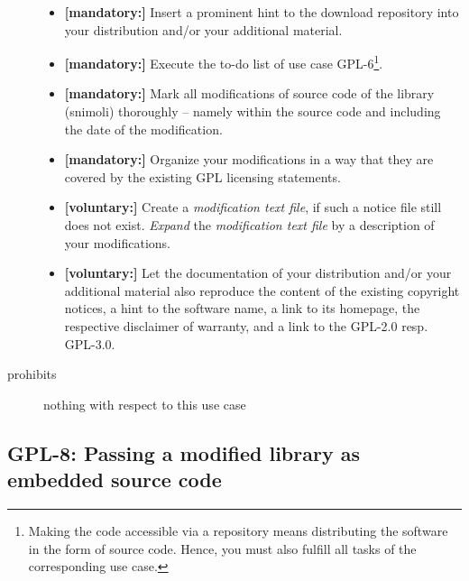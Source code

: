\begin{description}
\begin{itemize}
  \item \textbf{[mandatory:]} Insert a prominent hint to the download repository
  into your distribution and/or your additional material.
  
  \item \textbf{[mandatory:]} Execute the to-do list of use case GPL-6\footnote{
  Making the code accessible via a repository means distributing the software in
  the form of source code. Hence, you must also fulfill all tasks of the
  corresponding use case.}.

  \item \textbf{[mandatory:]} Mark all modifications of source code of the
  library (snimoli) thoroughly -- namely within the source code and including
  the date of the modification.

  \item \textbf{[mandatory:]} Organize your modifications in a way that they are
  covered by the existing GPL licensing statements.
    
  \item \textbf{[voluntary:]} Create a \emph{modification text file}, if such a
  notice file still does not exist. \emph{Expand} the \emph{modification text
  file} by a description of your modifications.

  \item \textbf{[voluntary:]} Let the documentation of your distribution and/or
  your additional material also reproduce the content of the existing
  copyright notices, a hint to the software name, a link to its homepage,
  the respective disclaimer of warranty, and a link to the GPL-2.0 resp.
  GPL-3.0.
  
\end{itemize}

\item[prohibits] nothing with respect to this use case
\end{description}

\subsection{GPL-8: Passing a modified library as embedded source code}
\label{OSUC-10S-GPL}

